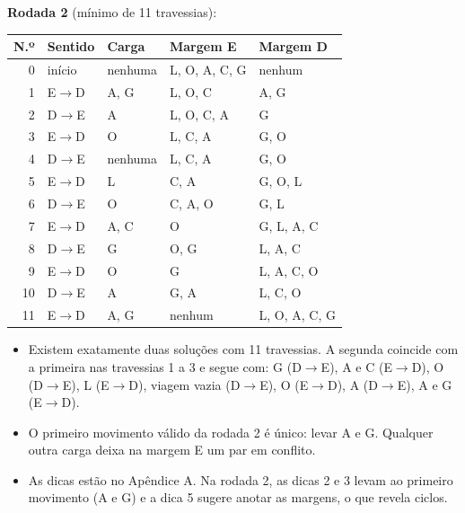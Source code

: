 \documentclass[12pt,a4paper]{article}
\begin{document}
\textbf{Rodada 2} (mínimo de 11 travessias):

\begin{center}
\renewcommand{\arraystretch}{1.0}
\small
\begin{tabular}{@{}rllll@{}}
\toprule
\textbf{N.º} & \textbf{Sentido} & \textbf{Carga} & \textbf{Margem E} & \textbf{Margem D} \\
\midrule
0  & início              & nenhuma & L, O, A, C, G & nenhum        \\
1  & E$\rightarrow$D     & A, G    & L, O, C       & A, G          \\
2  & D$\rightarrow$E     & A       & L, O, C, A    & G             \\
3  & E$\rightarrow$D     & O       & L, C, A       & G, O          \\
4  & D$\rightarrow$E     & nenhuma & L, C, A       & G, O          \\
5  & E$\rightarrow$D     & L       & C, A          & G, O, L       \\
6  & D$\rightarrow$E     & O       & C, A, O       & G, L          \\
7  & E$\rightarrow$D     & A, C    & O             & G, L, A, C    \\
8  & D$\rightarrow$E     & G       & O, G          & L, A, C       \\
9  & E$\rightarrow$D     & O       & G             & L, A, C, O    \\
10 & D$\rightarrow$E     & A       & G, A          & L, C, O       \\
11 & E$\rightarrow$D     & A, G    & nenhum        & L, O, A, C, G \\
\bottomrule
\end{tabular}
\end{center}

\begin{itemize}
  \item Existem exatamente duas soluções com 11 travessias. A segunda coincide
        com a primeira nas travessias 1 a 3 e segue com: G (D$\rightarrow$E),
        A e C (E$\rightarrow$D), O (D$\rightarrow$E), L (E$\rightarrow$D),
        viagem vazia (D$\rightarrow$E), O (E$\rightarrow$D), A
        (D$\rightarrow$E), A e G (E$\rightarrow$D).
  \item O primeiro movimento válido da rodada 2 é único: levar A e G. Qualquer
        outra carga deixa na margem E um par em conflito.
  \item As dicas estão no Apêndice A. Na rodada 2, as dicas 2 e 3 levam ao
        primeiro movimento (A e G) e a dica 5 sugere anotar as margens, o que
        revela ciclos.
\end{itemize}
\end{document}
